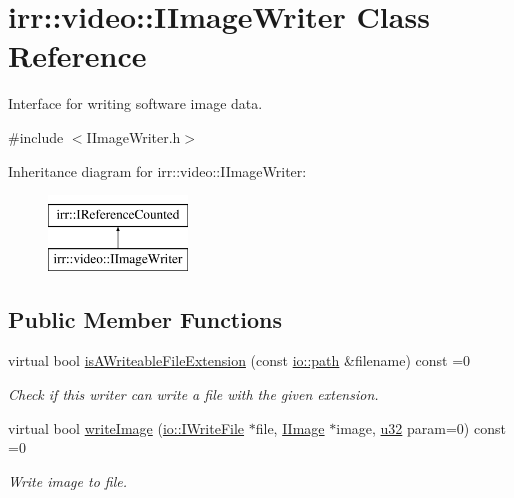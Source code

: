 \hypertarget{classirr_1_1video_1_1IImageWriter}{}\section{irr\+:\+:video\+:\+:I\+Image\+Writer Class Reference}
\label{classirr_1_1video_1_1IImageWriter}


Interface for writing software image data.  




{\ttfamily \#include $<$I\+Image\+Writer.\+h$>$}

Inheritance diagram for irr\+:\+:video\+:\+:I\+Image\+Writer\+:\begin{figure}[H]
\begin{center}
\leavevmode
\includegraphics[height=2.000000cm]{classirr_1_1video_1_1IImageWriter}
\end{center}
\end{figure}
\subsection*{Public Member Functions}
\begin{DoxyCompactItemize}
\item 
virtual bool \hyperlink{classirr_1_1video_1_1IImageWriter_a41511c91ebb7f7d80085ed828455fc1c}{is\+A\+Writeable\+File\+Extension} (const \hyperlink{namespaceirr_1_1io_ab1bdc45edb3f94d8319c02bc0f840ee1}{io\+::path} \&filename) const  =0
\begin{DoxyCompactList}\small\item\em Check if this writer can write a file with the given extension. \end{DoxyCompactList}\item 
virtual bool \hyperlink{classirr_1_1video_1_1IImageWriter_a362efef33e28bc15fd1e307f0145dba8}{write\+Image} (\hyperlink{classirr_1_1io_1_1IWriteFile}{io\+::\+I\+Write\+File} $\ast$file, \hyperlink{classirr_1_1video_1_1IImage}{I\+Image} $\ast$image, \hyperlink{namespaceirr_a0416a53257075833e7002efd0a18e804}{u32} param=0) const  =0
\begin{DoxyCompactList}\small\item\em Write image to file. \end{DoxyCompactList}\end{DoxyCompactItemize}
